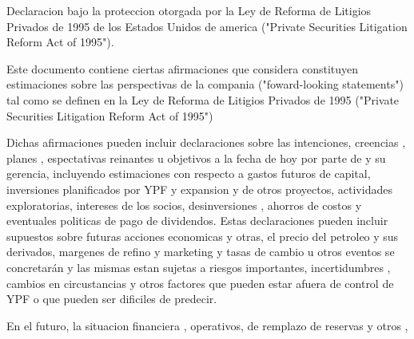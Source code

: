 \qquad Declaracion bajo la proteccion otorgada por la Ley de Reforma de Litigios Privados de 1995 de los Estados Unidos de america ("Private Securities Litigation Reform Act of 1995").

Este documento contiene ciertas afirmaciones que \nameBrand considera constituyen estimaciones sobre las perspectivas de la compania ("foward-looking statements") tal como se definen en la Ley de Reforma de Litigios Privados de 1995 ("Private Securities Litigation Reform Act of 1995")

Dichas afirmaciones pueden incluir declaraciones sobre las intenciones, creencias , planes , espectativas reinantes u objetivos a la fecha de hoy por parte de \nameBrand y su gerencia, incluyendo estimaciones con respecto a gastos futuros de capital, inversiones planificados por YPF y expansion y de otros proyectos, actividades exploratorias, intereses de los socios, desinversiones , ahorros de costos y eventuales politicas de pago de dividendos. Estas declaraciones pueden incluir supuestos sobre futuras acciones economicas y otras, el precio del petroleo y sus derivados, margenes de refino y marketing y tasas de cambio u otros eventos se concretarán y las mismas estan sujetas a riesgos importantes, incertidumbres , cambios en circustancias y otros factores que pueden estar afuera de control de YPF o que pueden ser dificiles de predecir.

En el futuro, la situacion financiera , operativos, de remplazo de reservas y otros , 